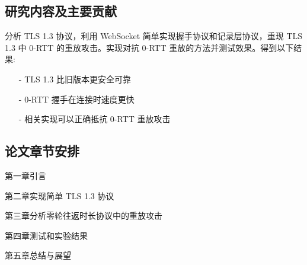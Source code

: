 \subsection{研究内容及主要贡献}

分析 TLS 1.3 协议，利用 WebSocket 简单实现握手协议和记录层协议，重现 TLS 1.3 中 0-RTT 的重放攻击。实现对抗 0-RTT 重放的方法并测试效果。得到以下结果:

\begin{itemize}
  \item[-] TLS 1.3 比旧版本更安全可靠
  \item[-] 0-RTT 握手在连接时速度更快
  \item[-] 相关实现可以正确抵抗 0-RTT 重放攻击
\end{itemize}

\subsection{论文章节安排}
\label{sec:arrangement}

第一章引言

第二章实现简单 TLS 1.3 协议

第三章分析零轮往返时长协议中的重放攻击

第四章测试和实验结果

第五章总结与展望

\afterpage{\null\newpage}
\newpage